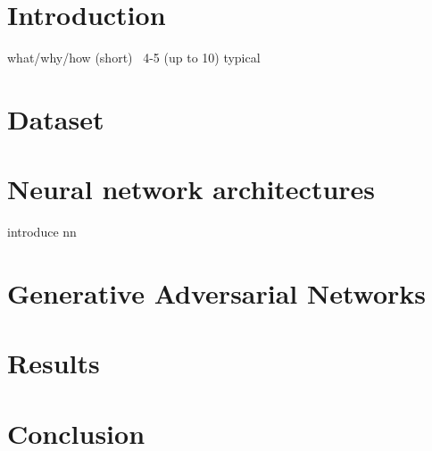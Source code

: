 \documentclass[a4paper,11pt]{Article}
\begin{document}
\tableofcontents

\begin{abstract}
\end{abstract}

\section{Introduction}
what/why/how (short)
~4-5 (up to 10) typical
\section{Dataset}
\section{Neural network architectures}
introduce nn
\section{Generative Adversarial Networks}
\section{Results}
\section{Conclusion}
\end{document}
